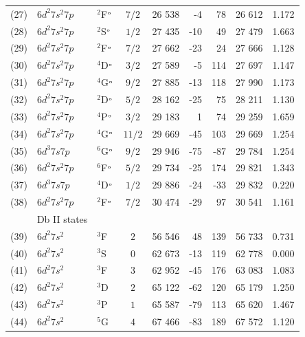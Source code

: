 \documentclass[8pt,a4paper, twoside]{report}
\begin{document}
\begin{table}[p!]
\begin{adjustwidth}{-1.3cm}{-1.3cm}
\begin{tabular}{cllcrrrrr}
(27)   & $6d^2 7s^2 7p$  &  $^2$F$^{\rm_o}$ &  $7/2$ &  26 538 & -4   &  78 & 26 612 & 1.172 \\ 
(28)   &  $6d^2 7s^2 7p$  &  $^2$S$^{\rm_o}$ &  $1/2$ &  27 435 & -10   &  49 & 27 479 & 1.663 \\ 
(29)  &   $6d^2 7s^2 7p$  &  $^2$F$^{\rm_o}$ &  $7/2$  &  27 662 & -23   & 24  & 27 666 & 1.128  \\ 
(30)  &  $6d^2 7s^2 7p$  &  $^4$D$^{\rm_o}$ &  $3/2$ &  27 589 & -5   & 114 & 27 697  & 1.147 \\ 
(31)  &  $6d^2 7s^2 7p$  &  $^4$G$^{\rm_o}$ &  $9/2$ &  27 885 & -13   &  118 & 27 990 & 1.173 \\ 
(32)   & $6d^2 7s^2 7p$  &  $^2$D$^{\rm_o}$ &  $5/2$ &  28 162 & -25  & 75 & 28 211  & 1.130 \\ 
(33)    &  $6d^2 7s^2 7p$  &  $^4$P$^{\rm_o}$ &  $3/2$ &  29 183 & 1  & 74 & 29 259 & 1.659 \\ 
(34)  & $6d^2 7s^2 7p$  &  $^4$G$^{\rm_o}$ &  $11/2$ &  29 669 & -45 & 103 & 29 669 & 1.254 \\ 
(35)  & $6d^3 7s 7p$  &  $^6$G$^{\rm_o}$ &  $9/2$ &  29 946 & -75  & -87 & 29 784 & 1.254 \\ 
(36)  &   $6d^2 7s^2 7p$  &  $^6$F$^{\rm_o}$  & $5/2$ &  29 734 &  -25  & 174  & 29 821 & 1.343 \\ 
(37) &  $6d^3 7s 7p$  &  $^4$D$^{\rm_o}$ &  $1/2$ &  29 886 & -24  &  -33  & 29 832 & 0.220 \\ 
(38)  &  $6d^2 7s^2 7p$  &  $^2$F$^{\rm_o}$  &  $7/2$ &  30 474 & -29  & 97 & 30 541  & 1.161 \\ 
 & Db II states\\
(39)  &   $6d^2 7s^2$  &  $^3$F &  $2$ & 56 546 & 48 & 139 & 56 733 & 0.731 \\ 
(40)  &   $6d^2 7s^2$  &  $^3$S &  $0$ & 62 673 & -13 & 119 & 62 778 & 0.000 \\ 
(41)  &   $6d^2 7s^2$  &  $^3$F &  $3$ & 62 952 & -45 & 176 & 63 083 & 1.083 \\ 
(42)  &   $6d^2 7s^2$  &  $^3$D &  $2$ & 65 122 & -62 & 120 & 65 179 & 1.250 \\ 
(43)  &   $6d^2 7s^2$  &  $^3$P &  $1$ & 65 587 & -79 & 113 & 65 620 & 1.467 \\ 
(44)  &   $6d^2 7s^2$  &  $^5$G &  $4$ & 67 466 & -83 & 189 & 67 572 & 1.120 \\ 
\bottomrule 
 \bottomrule 
\end{tabular} 
\end{adjustwidth}
\end{table}
\end{document}
